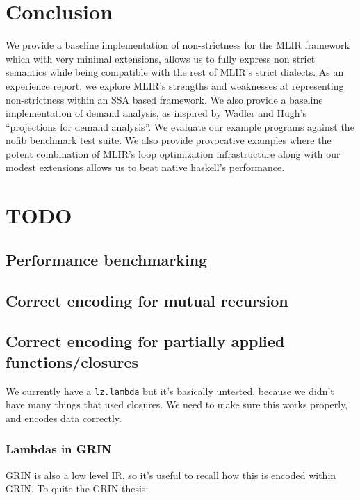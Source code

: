 \documentclass[sigplan,\review anonymous]{acmart}
\begin{document}
{\section{Conclusion}

We provide a baseline implementation of non-strictness for the MLIR framework
which with very minimal extensions, allows us to fully express non strict semantics
while being compatible with the rest of MLIR's strict dialects.
As an experience report, we explore MLIR's strengths and weaknesses at representing
non-strictness within an SSA based framework. We also provide a baseline implementation
of demand analysis, as inspired by Wadler and Hugh's ``projections for demand
analysis''. We evaluate our example programs against the nofib benchmark test suite.
We also provide provocative examples where the potent combination of MLIR's 
loop optimization infrastructure along with our modest extensions allows us to
beat native haskell's performance.

\section{TODO}

\subsection{Performance benchmarking}
\subsection{Correct encoding for mutual recursion}
\subsection{Correct encoding for partially applied functions/closures}

We currently have a \texttt{lz.lambda} but it's basically untested, because
we didn't have many things that used closures. We need to make sure this
works properly, and encodes data correctly.

\subsubsection{Lambdas in GRIN}
GRIN is also a low level IR, so it's useful to recall how this is encoded
within GRIN. To quite the GRIN thesis:



}
\end{document}
